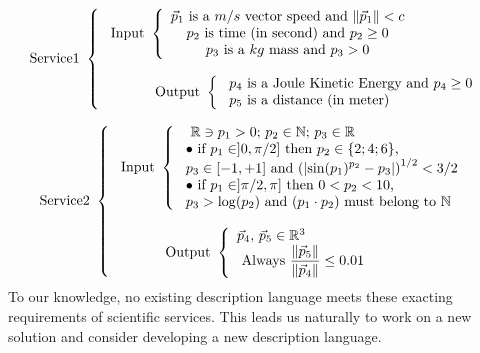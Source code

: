\documentclass[a4paper,11pt] {ivoa}
\begin{document}
\begin{equation}\label{PDLExemplum01}
\mbox{Service1 }\left\{
\begin{array}{l}
\ \mbox{Input } \left\{
\begin{array}{c}
 \mbox{$\vec p_1$ is a $m/s$ vector speed and $\| \vec p_1\|<c$} \\
 \mbox{ $p_2$ is time (in second) and $p_2 \geq 0$ }\\
 \mbox{$p_3$ is a $kg$ mass and $p_3 > 0$}\\
\end{array}
\right. \\
\\
\ \mbox{\hspace{1cm} Output } \left\{
\begin{array}{l}
 \mbox{ $p_4$ is a Joule Kinetic Energy and $p_4 \geq 0$} \\
 \mbox{ $p_5$ is a distance (in meter) }\\
 \end{array}
\right.\\
\end{array}
\right.
\end{equation}

\begin{equation}\label{PDLExemplum02}
\mbox{Service2 } \left\{
\begin{array}{l}
\ \mbox{Input } \left\{
\begin{array}{l}
\ \mbox{ $\mathbb R \ni p_1 >0$; $p_2 \in \mathbb N$; $p_3 \in \mathbb R$} \\
\  \bullet \mbox{ if $p_1 \in ]0,\pi/2]$ then $p_2 \in \{2;4;6\}$,}\\
\ \mbox{$p_3 \in [-1,+1]$ and $\displaystyle \left( \left|  \sin(p_1)^{p_2} -p_3 \right| \right)^{1/2}<3/2$ } \\
\ \bullet \mbox{ if $p_1 \in ]\pi/2,\pi]$ then $0<p_2 < 10$,}\\
\ \mbox{$p_3>\log(p_2)$ and $(p_1 \cdot p_2)$ must belong to $\mathbb N$} \\
\end{array}
\right. \\
\\
\ \mbox{\hspace{1cm} Output } \left\{
\begin{array}{l}
 \mbox{$\vec p_4, \, \vec p_5 \in \mathbb R^3$ } \\
 \ \mbox{Always $\displaystyle \frac{\| \vec p_5\|}{\|\vec p_4 \|} \leq 0.01 $} \\
 \end{array}
\right.\\
\end{array}
\right.
\end{equation}
To our knowledge, no existing description language meets these exacting requirements of scientific
services. This leads us naturally to work on a new solution and consider developing a new
description language.\\
\end{document}
